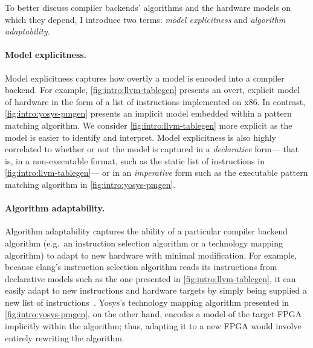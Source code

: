 To better discuss compiler backends'
  algorithms
  and the hardware models on which
  they depend,
  I introduce two terms:
  \textit{model explicitness}
  and
  \textit{algorithm adaptability.}
  
\paragraph{Model explicitness.}
Model explicitness
  captures
  how overtly
  a model is encoded
  into a compiler backend.
For example,
  \cref{fig:intro:llvm-tablegen}
  presents an overt, 
  explicit model of hardware
  in the form of a list
  of instructions
  implemented on x86.
In contrast,
  \cref{fig:intro:yosys-pmgen}
  presents an implicit model
  embedded within a pattern matching
  algorithm.
We consider
  \cref{fig:intro:llvm-tablegen} more explicit
  as the model is easier to identify
  and interpret.
Model explicitness is also highly correlated
  to whether or not the model
  is captured in a \textit{declarative} form---%
  that is, in a non-executable format,
  such as the static list of instructions
  in \cref{fig:intro:llvm-tablegen}---%
  or in an \textit{imperative} form
  such as the executable pattern matching
  algorithm in \cref{fig:intro:yosys-pmgen}.

\paragraph{Algorithm adaptability.}
Algorithm adaptability captures the
  ability of a particular compiler backend
  algorithm
  (e.g.~an instruction selection
    algorithm
    or a technology mapping algorithm)
  to adapt
  to new hardware
  with minimal modification.
For example,
  because
  clang's instruction selection algorithm
  reads its instructions from
  declarative models
  such as the one presented in
  \cref{fig:intro:llvm-tablegen},
  it can easily adapt to new instructions
  and hardware targets
  by simply being supplied
  a new list of instructions~\cite{llvminstructionselection}.
Yosys's technology mapping algorithm
  presented in 
  \cref{fig:intro:yosys-pmgen},
  on the other hand,
  encodes a model of the 
  target FPGA
  implicitly within the algorithm;
  thus, adapting it to a new FPGA
  would involve entirely rewriting
  the algorithm.

\vspace{10mm}

